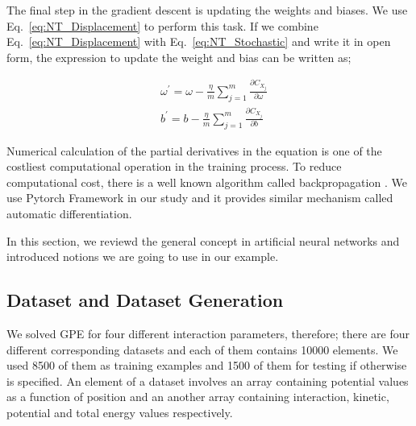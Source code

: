 \documentclass[a4paper,times,12pt]{article}
\begin{document}
The final step in the gradient descent is updating the weights and biases. We use Eq.~\eqref{eq:NT_Displacement} to perform this task. If we combine Eq.~\eqref{eq:NT_Displacement} with Eq.~\eqref{eq:NT_Stochastic} and write it in open form, the expression to update the weight and bias can be written as;

\begin{equation}
\label{eq:NT_weight_bias_update}
\begin{split}
& \omega^{\prime} = \omega - \frac{\eta}{m} \sum\limits_{j = 1}^{m} \frac{\partial{C_{X_j}}}{\partial{\omega}} \\
& b^{\prime} = b- \frac{\eta}{m} \sum\limits_{j = 1}^{m} \frac{\partial{C_{X_j}}}{\partial{b}}
\end{split}
\end{equation}

\noindent Numerical calculation of the partial derivatives in the equation is one of the costliest computational operation in the training process. To reduce computational cost, there is a well known algorithm called backpropagation \cite{goodfellow2016deep}. We use Pytorch Framework in our study and it provides similar mechanism called automatic differentiation. 

In this section, we reviewd the general concept in artificial neural networks and introduced notions we are going to use in our example. 


\subsection{Dataset and Dataset Generation}

We solved GPE for four different interaction parameters, therefore; there are four different corresponding datasets and each of them contains 10000 elements. We used 8500 of them as training examples and 1500 of them for testing if otherwise is specified. An element of a dataset involves an array containing potential values as a function of position and an another array containing interaction, kinetic, potential and total energy values respectively.
\end{document}
